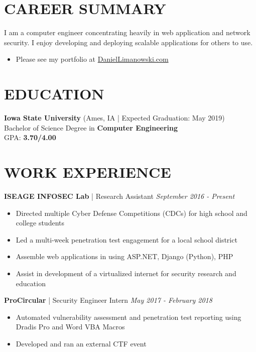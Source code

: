 \documentclass[line]{res}
\begin{document}
\address{(630) 450-0012\\dlimanow@iastate.edu\\Ames, Iowa}

\begin{resume}
\section{CAREER SUMMARY}
I am a computer engineer concentrating heavily in web application and network security. I enjoy developing and deploying scalable applications for others to use.
\begin{itemize}
	\item Please see my portfolio at \href{https://DanielLimanowski.com/}{DanielLimanowski.com}
\end{itemize}

\section{EDUCATION}
\textbf{Iowa State University} (Ames, IA | Expected Graduation: May 2019)\\
Bachelor of Science Degree in \textbf{Computer Engineering}\\
GPA: \textbf{3.70/4.00}

\section{WORK EXPERIENCE}
\textbf{ISEAGE INFOSEC Lab} | Research Assistant \hfill \textit{September 2016 - Present}
\begin{itemize}
	\item Directed multiple Cyber Defense Competitions (CDCs) for high school and college students
	\item Led a multi-week penetration test engagement for a local school district
	\item Assemble web applications in using ASP.NET, Django (Python), PHP
	\item Assist in development of a virtualized internet for security research and education
\end{itemize}

\textbf{ProCircular} | Security Engineer Intern \hfill \textit{May 2017 - February 2018}
\begin{itemize}
	\item Automated vulnerability assessment and penetration test reporting using Dradis Pro and Word VBA Macros
	\item Developed and ran an external CTF event
\end{itemize}


\end{resume}
\end{document}
